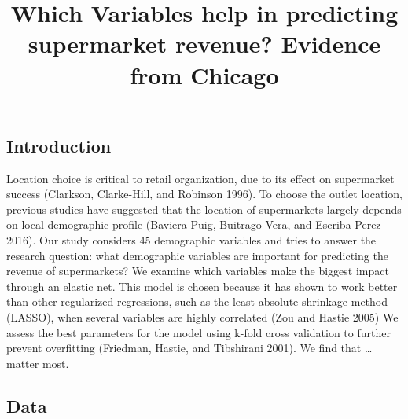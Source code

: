 \documentclass[
]{article}
\title{Which Variables help in predicting supermarket revenue? Evidence from
Chicago}
\author{}
\date{\vspace{-2.5em}}
\begin{document}
\maketitle

\hypertarget{introduction}{%
\subsection{Introduction}\label{introduction}}

Location choice is critical to retail organization, due to its effect on
supermarket success (Clarkson, Clarke-Hill, and Robinson 1996). To
choose the outlet location, previous studies have suggested that the
location of supermarkets largely depends on local demographic profile
(Baviera-Puig, Buitrago-Vera, and Escriba-Perez 2016). Our study
considers 45 demographic variables and tries to answer the research
question: what demographic variables are important for predicting the
revenue of supermarkets? We examine which variables make the biggest
impact through an elastic net. This model is chosen because it has shown
to work better than other regularized regressions, such as the least
absolute shrinkage method (LASSO), when several variables are highly
correlated (Zou and Hastie 2005) We assess the best parameters for the
model using k-fold cross validation to further prevent overfitting
(Friedman, Hastie, and Tibshirani 2001). We find that \ldots{} matter
most.

\hypertarget{data}{%
\subsection{Data}\label{data}}
\end{document}
